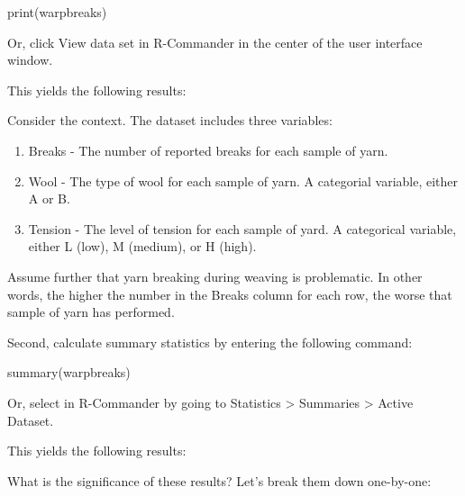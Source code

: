 print(warpbreaks)

Or, click View data set in R-Commander in the center of the user interface window.

This yields the following results:


Consider the context. The dataset includes three variables:

\begin{enumerate}
 \item Breaks - The number of reported breaks for each sample of yarn.
 \item Wool - The type of wool for each sample of yarn. A categorial variable, either A or B.
 \item Tension - The level of tension for each sample of yard. A categorical variable, either L (low), M (medium), or H (high).
\end{enumerate}

Assume further that yarn breaking during weaving is problematic. In other words, the higher the number in the Breaks column for each row, the worse that sample of yarn has performed. 

Second, calculate summary statistics by entering the following command:

summary(warpbreaks)

Or, select in R-Commander by going to Statistics > Summaries > Active Dataset.

This yields the following results:


What is the significance of these results? Let's break them down one-by-one:

